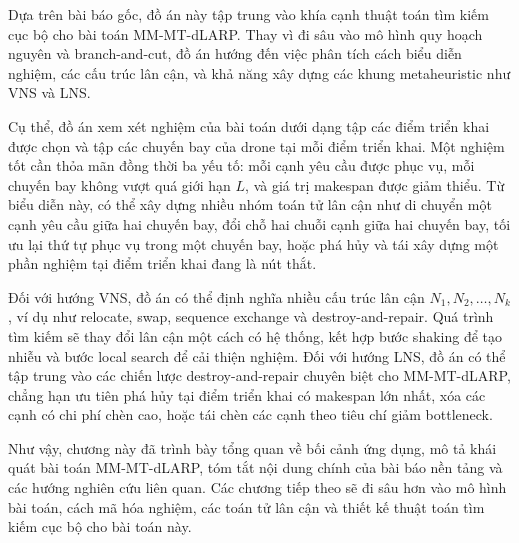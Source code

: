 Dựa trên bài báo gốc, đồ án này tập trung vào khía cạnh thuật toán tìm kiếm cục bộ cho bài toán MM-MT-dLARP. Thay vì đi sâu vào mô hình quy hoạch nguyên và branch-and-cut, đồ án hướng đến việc phân tích cách biểu diễn nghiệm, các cấu trúc lân cận, và khả năng xây dựng các khung metaheuristic như VNS và LNS.

Cụ thể, đồ án xem xét nghiệm của bài toán dưới dạng tập các điểm triển khai được chọn và tập các chuyến bay của drone tại mỗi điểm triển khai. Một nghiệm tốt cần thỏa mãn đồng thời ba yếu tố: mỗi cạnh yêu cầu được phục vụ, mỗi chuyến bay không vượt quá giới hạn \(L\), và giá trị makespan được giảm thiểu. Từ biểu diễn này, có thể xây dựng nhiều nhóm toán tử lân cận như di chuyển một cạnh yêu cầu giữa hai chuyến bay, đổi chỗ hai chuỗi cạnh giữa hai chuyến bay, tối ưu lại thứ tự phục vụ trong một chuyến bay, hoặc phá hủy và tái xây dựng một phần nghiệm tại điểm triển khai đang là nút thắt.

Đối với hướng VNS, đồ án có thể định nghĩa nhiều cấu trúc lân cận \(N_1, N_2, \ldots, N_k\), ví dụ như relocate, swap, sequence exchange và destroy-and-repair. Quá trình tìm kiếm sẽ thay đổi lân cận một cách có hệ thống, kết hợp bước shaking để tạo nhiễu và bước local search để cải thiện nghiệm. Đối với hướng LNS, đồ án có thể tập trung vào các chiến lược destroy-and-repair chuyên biệt cho MM-MT-dLARP, chẳng hạn ưu tiên phá hủy tại điểm triển khai có makespan lớn nhất, xóa các cạnh có chi phí chèn cao, hoặc tái chèn các cạnh theo tiêu chí giảm bottleneck.

Như vậy, chương này đã trình bày tổng quan về bối cảnh ứng dụng, mô tả khái quát bài toán MM-MT-dLARP, tóm tắt nội dung chính của bài báo nền tảng và các hướng nghiên cứu liên quan. Các chương tiếp theo sẽ đi sâu hơn vào mô hình bài toán, cách mã hóa nghiệm, các toán tử lân cận và thiết kế thuật toán tìm kiếm cục bộ cho bài toán này.
